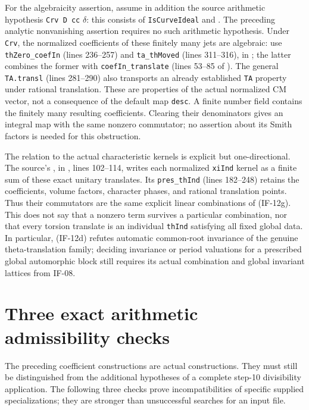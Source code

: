 \documentclass[11pt,a4paper]{article}
\theoremstyle{definition}
\theoremstyle{remark}
\begin{document}
For the algebraicity assertion, assume in addition the source
arithmetic hypothesis \texttt{Crv D cc} $\delta$: this consists of
\texttt{IsCurveIdeal} and
. The preceding
analytic nonvanishing assertion requires no such arithmetic
hypothesis. Under \texttt{Crv}, the normalized coefficients of
these finitely many jets are algebraic: use
\texttt{thZero\_coefIn} (lines 236--257) and
\texttt{ta\_thMoved} (lines 311--316), in
; the latter
combines the former with \texttt{coefIn\_translate} (lines 53--85
of ). The general
\texttt{TA.transl} (lines 281--290) also transports an already
established \texttt{TA} property under rational translation.
These are properties of the actual normalized CM vector, not a
consequence of the default map \texttt{desc}. A finite number field
contains the finitely many resulting coefficients. Clearing their
denominators gives an integral map with the same nonzero commutator;
no assertion about its Smith factors is needed for this obstruction.

The relation to the actual characteristic kernels is explicit but
one-directional. The source's
, in
,
lines 102--114, writes each normalized \texttt{xiInd} kernel as a
finite sum of these exact unitary translates. Its
\texttt{pres\_thInd} (lines 182--248) retains the coefficients,
volume factors, character phases, and rational translation points.
Thus their commutators are the same explicit linear combinations of
(IF-12g). This does not say that a nonzero term survives a particular
combination, nor that every torsion translate is an individual
\texttt{thInd} satisfying all fixed global data. In particular,
(IF-12d) refutes automatic common-root invariance of the genuine
theta-translation family; deciding invariance or period valuations
for a prescribed global automorphic block still requires its actual
combination and global invariant lattices from IF-08.



\section{Three exact arithmetic admissibility checks}
\label{sec:arithmetic-admissibility}

The preceding coefficient constructions are actual constructions.
They must still be distinguished from the additional hypotheses of
a complete step-10 divisibility application. The following three
checks prove incompatibilities of specific supplied specializations;
they are stronger than unsuccessful searches for an input file.
\end{document}
